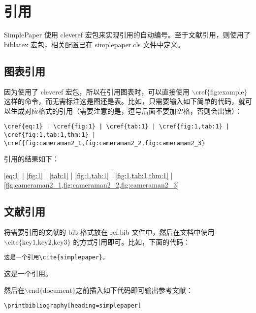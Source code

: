 \section{引用}

SimplePaper 使用 cleveref 宏包来实现引用的自动编号。至于文献引用，则使用了 biblatex 宏包，相关配置已在 simplepaper.cls 文件中定义。

\subsection{图表引用}
因为使用了 cleveref 宏包，所以在引用图表时，可以直接使用 $\backslash$cref$\{$fig:example$\}$ 这样的命令，而无需标注这是图还是表。比如，只需要输入如下简单的代码，就可以生成对应格式的引用（需要注意的是，逗号后面不要加空格，否则会出错）：
\begin{lstlisting}
\cref{eq:1} | \cref{fig:1} | \cref{tab:1} | \cref{fig:1,tab:1} | \cref{fig:1,tab:1,thm:1} | \cref{fig:cameraman2_1,fig:cameraman2_2,fig:cameraman2_3}
\end{lstlisting}
引用的结果如下：
\begin{shaded}
\cref{eq:1} | \cref{fig:1} | \cref{tab:1} | \cref{fig:1,tab:1} | \cref{fig:1,tab:1,thm:1} | \cref{fig:cameraman2_1,fig:cameraman2_2,fig:cameraman2_3}
\end{shaded}

\subsection{文献引用}

将需要引用的文献的 bib 格式放在 ref.bib 文件中，然后在文档中使用 $\backslash \text{cite}\{\text{key1,key2,key3}\}$ 的方式引用即可。比如，下面的代码：
\begin{lstlisting}
这是一个引用\cite{simplepaper}。
\end{lstlisting}
\begin{shaded}
这是一个引用\cite{simplepaper}。
\end{shaded}
然后在$\backslash\text{end}\{\text{document}\}$之前插入如下代码即可输出参考文献：
\begin{lstlisting}
\printbibliography[heading=simplepaper]
\end{lstlisting}